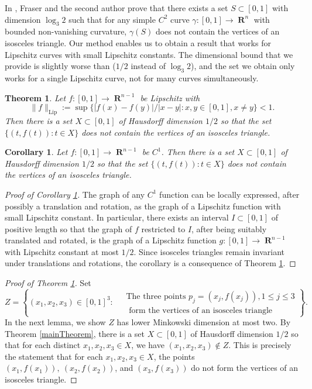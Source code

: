 \documentclass[dvipsnames,letterpaper,12pt]{article}
\numberwithin{equation}{section}
\theoremstyle{plain}
\newtheorem{theorem}{Theorem}
\newtheorem{corollary}{Corollary}
\theoremstyle{remark}
\DeclareMathOperator{\RR}{\mathbf{R}}
\DeclareMathOperator{\setcolon}{\colon}
\begin{document}
In \cite{MalabikaRob}, Fraser and the second author prove that there exists a set $S \subset [0,1]$ with dimension $\log_3 2$ such that for any simple $C^2$ curve $\gamma \colon [0,1] \to \RR^n$ with bounded non-vanishing curvature, $\gamma(S)$ does not contain the vertices of an isosceles triangle. Our method enables us to obtain a result that works for Lipschitz curves with small Lipschitz constants. The dimensional bound that we provide is slightly worse than \cite{MalabikaRob} ($1/2$ instead of $\log_3 2$), and the set we obtain only works for a single Lipschitz curve, not for many curves simultaneously.

\begin{theorem}\label{C1IsoscelesThm}
	Let $f\colon [0,1] \to \RR^{n-1}$ be Lipschitz with \[ \| f \|_{\text{Lip}}  := \sup \bigl\{|f(x) - f(y)|/|x-y| : x, y \in [0,1], x \ne y   \bigr\} < 1. \]  Then there is a set $X \subset [0,1]$ of Hausdorff dimension $1/2$ so that the set $\{(t,f(t)) \setcolon t\in X\}$ does not contain the vertices of an isosceles triangle.
\end{theorem}

\begin{corollary}
\label{C1IsoscelesCor}
Let $f\colon [0,1] \to \RR^{n-1}$ be $C^1$.  Then there is a set $X \subset [0,1]$ of Hausdorff dimension $1/2$ so that the set $\{(t,f(t)) \setcolon t\in X\}$ does not contain the vertices of an isosceles triangle.
\end{corollary} 
\begin{proof}[Proof of Corollary \ref{C1IsoscelesCor}]
The graph of any $C^1$ function can be locally expressed, after possibly a translation and rotation, as the graph of a Lipschitz function with small Lipschitz constant. In particular, there exists an interval $I\subset[0,1]$ of positive length so that the graph of $f$ restricted to $I$, after being suitably translated and rotated, is the graph of a Lipschitz function $g\colon [0,1] \to \RR^{n-1}$ with Lipschitz constant at most $1/2$. Since isosceles triangles remain invariant under translations and rotations, the corollary is a consequence of Theorem \ref{C1IsoscelesThm}.  
\end{proof} 

\begin{proof}[Proof of Theorem \ref{C1IsoscelesThm}]
	Set
	\begin{equation} \label{def-Z} Z = \left\{ (x_1,x_2,x_3) \in [0,1]^3 \setcolon \; \begin{aligned} &{\text{The three points }} p_j = (x_j,f(x_j)), 1 \leq j \leq 3 \\  &\text{ form the vertices of an isosceles triangle} \end{aligned} \right\}. \end{equation} 
	In the next lemma, we show $Z$ has lower Minkowski dimension at most two. By Theorem \ref{mainTheorem}, there is a set $X \subset[0,1]$ of Hausdorff dimension $1/2$ so that for each distinct $x_1,x_2,x_3\in X$, we have $(x_1,x_2,x_3)\not\in Z$. This is precisely the statement that for each $x_1,x_2,x_3\in X$, the points $(x_1,f(x_1)),\ (x_2,f(x_2))$, and $(x_3,f(x_3))$ do not form the vertices of an isosceles triangle. 
\end{proof}
\end{document}
